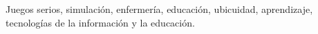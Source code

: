 \documentclass[conference]{util/IEEEtran}
\begin{document}
\begin{IEEEkeywords}
    Juegos serios, simulación, enfermería, educación, ubicuidad, aprendizaje, tecnologías de la información y la educación. 
\end{IEEEkeywords}










%


\printbibliography{}
\end{document}
